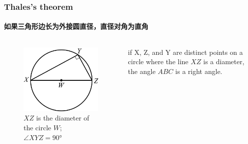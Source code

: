 \documentclass[
	11pt, %
]{beamer}
\begin{document}
\begin{frame}
\frametitle{Thales's theorem}
\framesubtitle{如果三角形边长为外接圆直径，直径对角为直角}

\begin{columns}[t] 
		\begin{column}{0.4\textwidth} %
			\begin{figure}
				\includegraphics[width=\linewidth]{Inscribe_Right.jpg}
				\caption{$XZ$ is the diameter of the circle $W$; $\angle XYZ = \ang{90}	$}
			\end{figure}
		\end{column}
		\begin{column}{0.6\textwidth} %
		\begin{definition}
			if X, Z, and Y are distinct points on a circle where the line $XZ$ is a diameter, the angle $ABC$ is a right angle.
		\end{definition}
		\end{column}
	\end{columns}
\end{frame}

\end{document}
